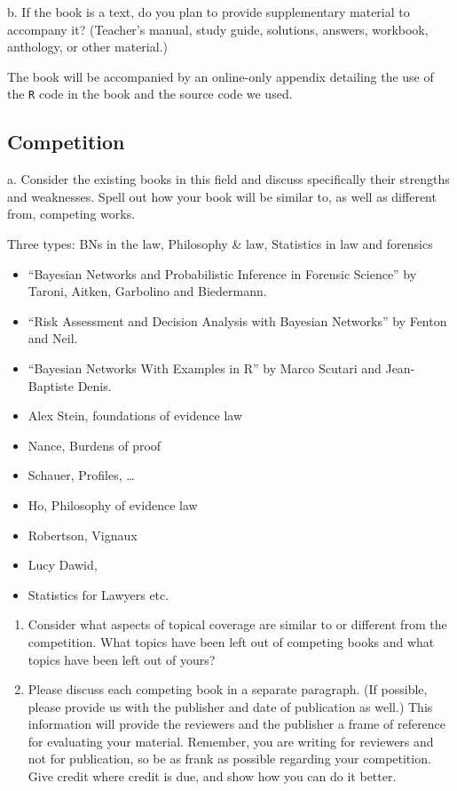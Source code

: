 \documentclass[10pt,dvipsnames,enabledeprecatedfontcommands]{scrartcl}
\begin{document}
\footnotesize b. If the book is a text, do you plan to provide
supplementary material to accompany it? (Teacher's manual, study guide,
solutions, answers, workbook, anthology, or other material.)

\vspace{2mm}

\normalsize

The book will be accompanied by an online-only appendix detailing the
use of the \texttt{R} code in the book and the source code we used.

\subsection{Competition}\label{competition}

\footnotesize a. Consider the existing books in this field and discuss
specifically their strengths and weaknesses. Spell out how your book
will be similar to, as well as different from, competing works.


\normalsize 

Three types: BNs in the law, Philosophy \& law, Statistics in law and
forensics

\begin{itemize}
\item
  ``Bayesian Networks and Probabilistic Inference in Forensic Science''
  by Taroni, Aitken, Garbolino and Biedermann.
\item
  ``Risk Assessment and Decision Analysis with Bayesian Networks'' by
  Fenton and Neil.
\item
  ``Bayesian Networks With Examples in R'' by Marco Scutari and
  Jean-Baptiste Denis.
\item
  Alex Stein, foundations of evidence law
\item
  Nance, Burdens of proof
\item
  Schauer, Profiles, \dots
\item
  Ho, Philosophy of evidence law
\item
  Robertson, Vignaux
\item
  Lucy Dawid,
\item
  Statistics for Lawyers etc.
\end{itemize}

\begin{enumerate}
\def\labelenumi{\alph{enumi}.}
\setcounter{enumi}{1}
\item
  Consider what aspects of topical coverage are similar to or different
  from the competition. What topics have been left out of competing
  books and what topics have been left out of yours?
\item
  Please discuss each competing book in a separate paragraph. (If
  possible, please provide us with the publisher and date of publication
  as well.) This information will provide the reviewers and the
  publisher a frame of reference for evaluating your material. Remember,
  you are writing for reviewers and not for publication, so be as frank
  as possible regarding your competition. Give credit where credit is
  due, and show how you can do it better.
\end{enumerate}
\end{document}
